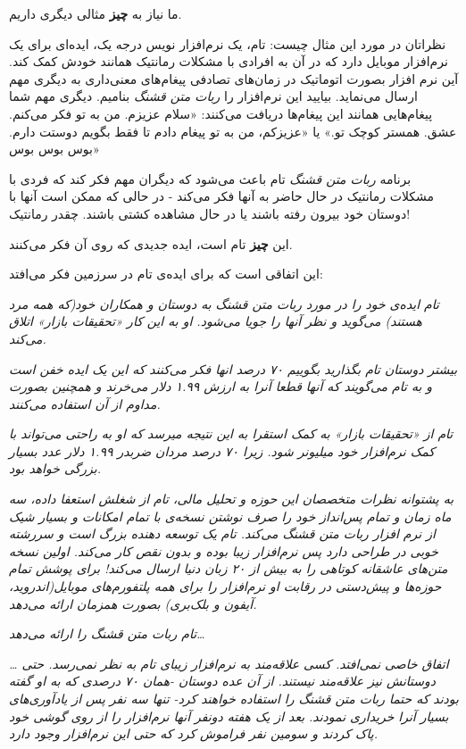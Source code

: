 ما نیاز به \textbf{چیز} مثالی دیگری داریم.

نظراتان در مورد این مثال چیست: تام، یک نرم‌افزار نویس درجه یک، ایده‌ای
برای یک نرم‌افزار موبایل دارد که در آن به افرادی با مشکلات رمانتیک
همانند خودش کمک کند. آین نرم افزار بصورت اتوماتیک در زمان‌های تصادفی
پیغام‌های معنی‌داری به دیگری مهم ارسال می‌نماید. بیایید این نرم‌افزار را
\emph{ربات متن قشنگ} بنامیم. دیگری مهم شما پیغام‌هایی همانند این
پیغام‌ها دریافت می‌کنند: «سلام عزیزم. من به تو فکر می‌کنم. عشق. همستر
کوچک تو.» یا «عزیزکم، من به تو پیغام دادم تا فقط بگویم دوستت دارم. بوس
بوس بوس»

برنامه \emph{ربات متن قشنگ} تام باعث می‌شود که دیگران مهم فکر کند که
فردی با مشکلات رمانتیک در حال حاضر به آنها فکر می‌کند - در حالی که ممکن
است آنها با دوستان خود بیرون رفته باشند یا در حال مشاهده کشتی باشند.
چقدر رمانتیک!

این \textbf{چیز} تام است، ایده جدیدی که روی آن فکر می‌کنند.

این اتفاقی است که برای ایده‌ی تام در سرزمین فکر می‌افتد:

\emph{تام ایده‌ی خود را در مورد ربات متن قشنگ به دوستان و همکاران خود(که
همه مرد هستند) می‌گوید و نظر آنها را جویا می‌شود. او به این کار «تحقیقات
بازار» اتلاق می‌کند.}

\emph{بیشتر دوستان تام بگذارید بگوییم ۷۰ درصد انها فکر می‌کنند که این یک
ایده خفن است و به تام می‌گویند که آنها قطعا آنرا به ارزش ۱.۹۹ دلار
می‌خرند و همچنین بصورت مداوم از آن استفاده می‌کنند.}

\emph{تام از «تحقیقات بازار» به کمک استقرا به این نتیجه میرسد که او به
راحتی می‌تواند با کمک نرم‌افزار خود میلیونر شود. زیرا ۷۰ درصد مردان
ضربدر ۱.۹۹ دلار عدد بسیار بزرگی خواهد بود.}

\emph{به پشتوانه نظرات متخصصان این حوزه و تحلیل مالی، تام از شغلش استعفا
داده، سه ماه زمان و تمام پس‌انداز خود را صرف نوشتن نسخه‌ی با تمام
امکانات و بسیار شیک از نرم افزار ربات متن قشنگ می‌کند. تام یک توسعه
دهنده بزرگ است و سررشته خوبی در طراحی دارد پس نرم‌افزار زیبا بوده و بدون
نقص کار می‌کند. اولین نسخه متن‌های عاشقانه کوتاهی را به بیش از ۲۰ زبان
دنیا ارسال می‌کند! برای پوشش تمام حوزه‌ها و پیش‌دستی در رقابت او
نرم‌افزار را برای همه پلتفورم‌های موبایل(اندروید، آیفون و بلک‌بری) بصورت
همزمان ارائه می‌دهد.}

\emph{تام ربات متن قشنگ را ارائه می‌دهد\ldots{}}

\emph{\ldots{} اتفاق خاصی نمی‌افتد. کسی علاقه‌مند به نرم‌افزار زیبای تام
به نظر نمی‌رسد. حتی دوستانش نیز علاقه‌مند نیستند. از آن عده دوستان -همان
۷۰ درصدی که به او گفته بودند که حتما ربات متن قشنگ را استفاده خواهند
کرد- تنها سه نفر پس از یادآوری‌های بسیار آنرا خریداری نمودند. بعد از یک
هفته دونفر آنها نرم‌افزار را از روی گوشی خود پاک کردند و سومین نفر
فراموش کرد که حتی این نرم‌افزار وجود دارد.}

